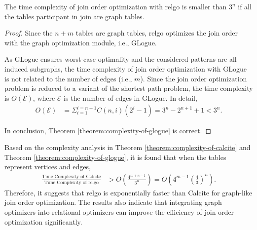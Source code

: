 \begin{theorem}
    \label{theorem:complexity-of-glogue}
    The time complexity of join order optimization with relgo is smaller than $3^n$ if all the tables participant in join are graph tables.
\end{theorem}
\begin{proof}
    Since the $n + m$ tables are graph tables, relgo optimizes the join order with the graph optimization module, i.e., GLogue.

    As GLogue ensures worst-case optimality and the considered patterns are all induced subgraphs, the time complexity of join order optimization with GLogue is not related to the number of edges (i.e., $m$).
    Since the join order optimization problem is reduced to a variant of the shortest path problem, the time complexity is $O(\mathcal{E})$, where $\mathcal{E}$ is the number of edges in GLogue.
    In detail, 
    \begin{equation*}
        \begin{split}
            O(\mathcal{E}) & = \Sigma_{i=1}^{i=n-1}C(n, i)(2^i - 1) = 3^n - 2^{n+1} +1 < 3^n.
        \end{split}
    \end{equation*}
    
    In conclusion, Theorem \ref{theorem:complexity-of-glogue} is correct.

\end{proof}

Based on the complexity analysis in Theorem \ref{theorem:complexity-of-calcite} and Theorem \ref{theorem:complexity-of-glogue}, it is found that when the tables represent vertices and edges, 
\begin{equation*}
    \begin{split}
        \frac{\text{Time Complexity of Calcite}}{\text{Time Complexity of relgo}} & > O(\frac{4^{m+n-1}}{3^n}) = O(4^{m-1}(\frac{4}{3})^n).
    \end{split}
\end{equation*}
Therefore, it suggests that relgo is exponentially faster than Calcite for graph-like join order optimization.
The results also indicate that integrating graph optimizers into relational optimizers can improve the efficiency of join order optimization significantly.


